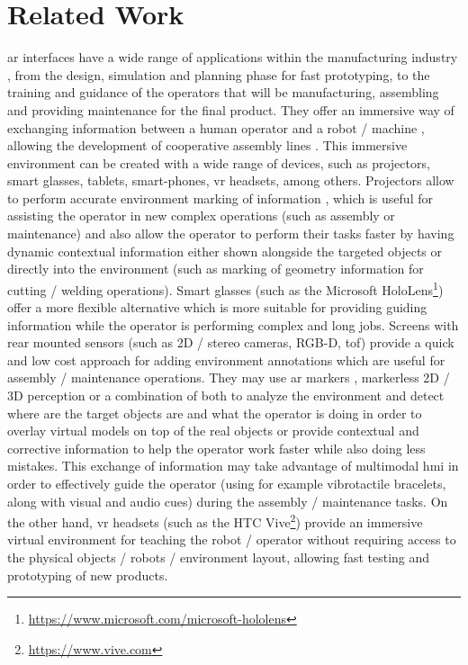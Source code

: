 \section{Related Work}\label{sec:related-work}

\gls{ar} interfaces \cite{Bimber2005} have a wide range of applications within the manufacturing industry \cite{Nee2012,Wang2016}, from the design, simulation \cite{WangOng2016} and planning phase for fast prototyping, to the training \cite{Gorecky2011} and guidance \cite{Webel2011,Gavish2015} of the operators that will be manufacturing, assembling and providing maintenance for the final product. They offer an immersive way of exchanging information between a human operator and a robot / machine \cite{Kollatsch2014,Gaschler2014,Dini2015,Michalos2016}, allowing the development of cooperative assembly lines \cite{Lenz2011,Michalos2014,Makris2016}. This immersive environment can be created with a wide range of devices, such as projectors, smart glasses, tablets, smart-phones, \gls{vr} headsets, among others. Projectors allow to perform accurate environment marking of information \cite{Tan2013,Fujimoto2014}, which is useful for assisting the operator in new complex operations (such as assembly or maintenance) and also allow the operator to perform their tasks faster by having dynamic contextual information either shown alongside the targeted objects or directly into the environment (such as marking of geometry information for cutting / welding operations). Smart glasses (such as the Microsoft HoloLens\footnote{\url{https://www.microsoft.com/microsoft-hololens}}) offer a more flexible alternative which is more suitable for providing guiding information while the operator is performing complex and long jobs. Screens with rear mounted sensors (such as 2D / stereo cameras, RGB-D, \gls{tof}) provide a quick and low cost approach for adding environment annotations which are useful for assembly / maintenance operations. They may use \gls{ar} markers \cite{Siltanen2012}, markerless 2D / 3D perception \cite{Andreopoulos2013,Guo2014} or a combination of both \cite{Wang2009} to analyze the environment and detect where are the target objects are and what the operator is doing \cite{Bannat2008} in order to overlay virtual models on top of the real objects or provide contextual and corrective information to help the operator work faster while also doing less mistakes. This exchange of information may take advantage of multimodal \gls{hmi} \cite{Webel2013} in order to effectively guide the operator (using for example vibrotactile bracelets, along with visual and audio cues) during the assembly / maintenance tasks. On the other hand, \gls{vr} headsets (such as the HTC Vive\footnote{\url{https://www.vive.com}}) provide an immersive virtual environment for teaching the robot / operator without requiring access to the physical objects / robots / environment layout, allowing fast testing and prototyping of new products.
